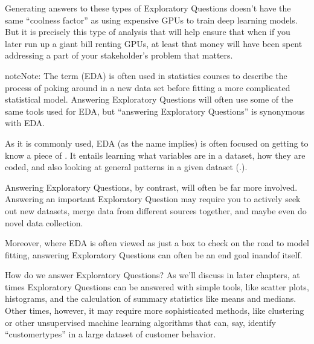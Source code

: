 \documentclass[letterpaper,10pt,english]{jupyterBook}
\begin{document}
\sphinxAtStartPar
Generating answers to these types of Exploratory Questions doesn’t have the same “coolness factor” as using expensive GPUs to train deep learning models. But it is precisely this type of analysis that will help ensure that when if you  later run up a giant bill renting GPUs, at least that money will have been spent addressing a part of your stakeholder’s problem that matters.

\begin{sphinxadmonition}{note}{Note:}
\sphinxAtStartPar
The term  (EDA) is often used in statistics courses to describe the process of poking around in a new data set before fitting a more complicated statistical model. Answering Exploratory Questions will often use some of the same tools used for EDA, but “answering Exploratory Questions” is  synonymous with EDA.

\sphinxAtStartPar
As it is commonly used, EDA (as the name implies) is often focused on getting to know a piece of . It entails learning what variables are in a dataset, how they are coded, and  also looking at general patterns in a given dataset ({\hyperref[\detokenize{30_questions/07_eda::doc}]{}}.).

\sphinxAtStartPar
Answering Exploratory Questions, by contrast, will often be far more involved. Answering an important Exploratory Question may require you to actively seek out new datasets, merge data from different sources together, and maybe even do novel data collection.

\sphinxAtStartPar
Moreover, where EDA is often viewed as just a box to check on the road to model fitting, answering Exploratory Questions can often be an end goal in\sphinxhyphen{}and\sphinxhyphen{}of itself.
\end{sphinxadmonition}

\sphinxAtStartPar
How do we answer Exploratory Questions? As we’ll discuss in later chapters, at times Exploratory Questions can be answered with simple tools, like scatter plots, histograms, and the calculation of summary statistics like means and medians. Other times, however, it may require more sophisticated methods, like clustering or other unsupervised machine learning algorithms that can, say, identify “customer\sphinxhyphen{}types” in a large dataset of customer behavior.
\end{document}
